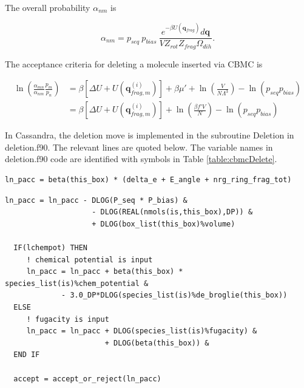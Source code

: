 The overall probability $\alpha_{nm}$ is 

\begin{equation}
\label{eq:alpha_cbmcReverseDelete}
\alpha_{nm} = p_{seq}\ p_{bias}\ \frac{e^{-\beta U(\mathbf{q}_{frag})}d\mathbf{q}}{VZ_{rot}Z_{frag}\Omega_{dih}}.
\end{equation}

The acceptance criteria for deleting a molecule inserted via CBMC is

\begin{align}
\label{eq:pAcc_cbmcDeleteMuShift}
\ln\left( \frac{\alpha_{mn}}{\alpha_{nm}} \frac{p_m}{p_n} \right) &= \beta \left[\Delta U + U(\mathbf{q}^{(i)}_{frag,m})\right] + \beta \mu' + \ln\left( \frac{V}{N\Lambda^3} \right) - \ln\left( p_{seq}p_{bias} \right) \\
\label{eq_pAcc_cbmcDeleteF}
&= \beta \left[\Delta U + U(\mathbf{q}^{(i)}_{frag,m})\right] + \ln\left( \frac{\beta f' V}{N} \right) - \ln\left( p_{seq}p_{bias} \right)
\end{align}

In Cassandra, the deletion move is implemented in the subroutine Deletion in deletion.f90. The relevant lines are quoted below. The variable names in deletion.f90 code are identified with symbols in Table \ref{table:cbmcDelete}.

\begin{minipage}{\linewidth}
\begin{lstlisting}[firstnumber=334, caption=deletion.f90]
  ln_pacc = beta(this_box) * (delta_e + E_angle + nrg_ring_frag_tot)
\end{lstlisting}
\begin{lstlisting}[firstnumber=340]
  ln_pacc = ln_pacc - DLOG(P_seq * P_bias) &
                    - DLOG(REAL(nmols(is,this_box),DP)) &
                    + DLOG(box_list(this_box)%volume)
 
  IF(lchempot) THEN
     ! chemical potential is input
     ln_pacc = ln_pacc + beta(this_box) * species_list(is)%chem_potential &
             - 3.0_DP*DLOG(species_list(is)%de_broglie(this_box))
  ELSE
     ! fugacity is input
     ln_pacc = ln_pacc + DLOG(species_list(is)%fugacity) &
                       + DLOG(beta(this_box)) &
  END IF
 
  accept = accept_or_reject(ln_pacc)

\end{lstlisting}
\end{minipage}

